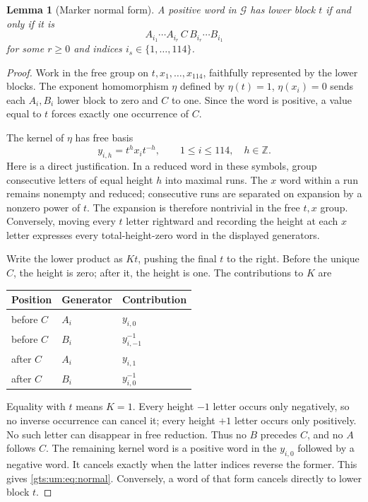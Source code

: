 \documentclass[11pt,letterpaper]{article}
\newtheorem{lemma}[theorem]{Lemma}
\theoremstyle{definition}
\theoremstyle{remark}
\newcommand{\Z}{\mathbb Z}
\begin{document}
\begin{lemma}[Marker normal form]\label{gts:um:lem:marker}
A positive word in $\mathcal G$ has lower block $t$ if and only if it is
\begin{equation}\label{gts:um:eq:normal}
 A_{i_1}\cdots A_{i_r}\,C\,B_{i_r}\cdots B_{i_1}
\end{equation}
for some $r\geq0$ and indices $i_s\in\{1,\ldots,114\}$.
\end{lemma}
\begin{proof}
Work in the free group on $t,x_1,\ldots,x_{114}$, faithfully represented by the lower blocks. The exponent homomorphism $\eta$ defined by $\eta(t)=1$, $\eta(x_i)=0$ sends each $A_i,B_i$ lower block to zero and $C$ to one. Since the word is positive, a value equal to $t$ forces exactly one occurrence of $C$.

The kernel of $\eta$ has free basis
\[
 y_{i,h}=t^h x_i t^{-h},\qquad 1\leq i\leq114,\quad h\in\Z.
\]
Here is a direct justification. In a reduced word in these symbols, group consecutive letters of equal height $h$ into maximal runs. The $x$ word within a run remains nonempty and reduced; consecutive runs are separated on expansion by a nonzero power of $t$. The expansion is therefore nontrivial in the free $t,x$ group. Conversely, moving every $t$ letter rightward and recording the height at each $x$ letter expresses every total-height-zero word in the displayed generators.

Write the lower product as $Kt$, pushing the final $t$ to the right. Before the unique $C$, the height is zero; after it, the height is one. The contributions to $K$ are
\begin{center}
\begin{tabular}{lll}\toprule
Position & Generator & Contribution\\\midrule
before $C$ & $A_i$ & $y_{i,0}$\\
before $C$ & $B_i$ & $y_{i,-1}^{-1}$\\
after $C$ & $A_i$ & $y_{i,1}$\\
after $C$ & $B_i$ & $y_{i,0}^{-1}$\\\bottomrule
\end{tabular}
\end{center}
Equality with $t$ means $K=1$. Every height $-1$ letter occurs only negatively, so no inverse occurrence can cancel it; every height $+1$ letter occurs only positively. No such letter can disappear in free reduction. Thus no $B$ precedes $C$, and no $A$ follows $C$. The remaining kernel word is a positive word in the $y_{i,0}$ followed by a negative word. It cancels exactly when the latter indices reverse the former. This gives \eqref{gts:um:eq:normal}. Conversely, a word of that form cancels directly to lower block $t$.
\end{proof}
\end{document}

